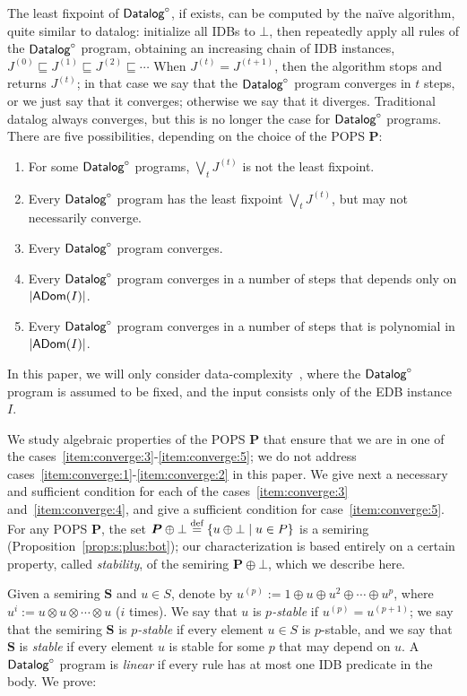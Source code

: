 The least fixpoint of $\text{\sf Datalog}^\circ$, if exists, can be computed by the na\"ive
algorithm, quite similar to datalog: initialize all IDBs to $\bot$,
then repeatedly apply all rules of the $\text{\sf Datalog}^\circ$ program, obtaining an
increasing chain of IDB instances,
$J^{(0)} \sqsubseteq J^{(1)} \sqsubseteq J^{(2)} \sqsubseteq \cdots$
When $J^{(t)} = J^{(t+1)}$, then the algorithm stops and returns
$J^{(t)}$; in that case we say that the $\text{\sf Datalog}^\circ$ program converges in
$t$ steps, or we just say that it converges; otherwise we say that it
diverges.  Traditional datalog always converges, but this is no longer
the case for $\text{\sf Datalog}^\circ$ programs.  There are five possibilities,
depending on the choice of the POPS $\bm P$:
%
\begin{enumerate}[label=(\roman*)]
\item \label{item:converge:1} For some $\text{\sf Datalog}^\circ$ programs, $\bigvee_t J^{(t)}$ is not the least fixpoint.
\item \label{item:converge:2} Every $\text{\sf Datalog}^\circ$ program has the least fixpoint $\bigvee_t J^{(t)}$, but may not necessarily converge.
\item \label{item:converge:3} Every $\text{\sf Datalog}^\circ$ program converges.
\item \label{item:converge:4} Every $\text{\sf Datalog}^\circ$ program converges in a
  number of steps that depends only on $|\textsf{ADom}(I)|$.
\item \label{item:converge:5} Every $\text{\sf Datalog}^\circ$ program converges in a
  number of steps that is polynomial in $|\textsf{ADom}(I)|$.
\end{enumerate}
%
In this paper, we will only consider
data-complexity~\cite{DBLP:conf/stoc/Vardi82}, where the $\text{\sf Datalog}^\circ$
program is assumed to be fixed, and the input consists only of the EDB
instance $I$.

We study algebraic properties of the POPS $\bm P$ that ensure that we
are in one of the cases~\ref{item:converge:3}-\ref{item:converge:5};
we do not address cases~\ref{item:converge:1}-\ref{item:converge:2} in
this paper.  We give next a necessary and sufficient condition for
each of the cases~\ref{item:converge:3} and~\ref{item:converge:4}, and
give a sufficient condition for case~\ref{item:converge:5}.  For any
POPS $\bm P$, the set
$\bm P \oplus \bot \stackrel{\text{def}}{=} \{{u\oplus \bot}\mid{u \in P}\}$ is a
semiring (Proposition~\ref{prop:s:plus:bot}); our characterization is based entirely on a certain
property, called {\em stability}, of the semiring $\bm P \oplus \bot$,
which we describe here.

Given a semiring $\bm S$ and $u \in S$, denote by
$u^{(p)} := 1 \oplus u \oplus u^2 \oplus \cdots \oplus u^{p}$, where
$u^{i} := u \otimes u \otimes \cdots \otimes u$ ($i$ times).  We say
that $u$ is {\em $p$-stable} if $u^{(p)}=u^{(p+1)}$; we say that the
semiring $\bm S$ is {\em $p$-stable} if every element $u \in S$ is $p$-stable, and
we say that $\bm S$ is {\em stable} if every element $u$ is stable for some
$p$ that may depend on $u$.
A $\text{\sf Datalog}^\circ$ program is {\em linear} if every rule has at most one IDB predicate in the body.
We prove:

